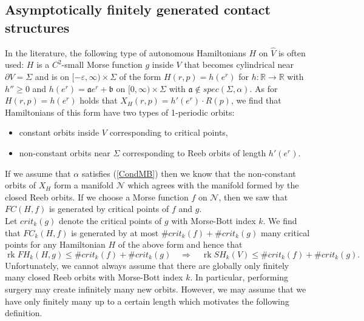 \documentclass[a4paper,12pt,bibliography=totocnumbered,titlepage=false,abstracton,bookmarksnumbered=true]{scrartcl}
\DeclareMathOperator{\rk}{rk}
\newcommand{\veps}{\varepsilon}
\theoremstyle{definition}
\begin{document}
\subsection{Asymptotically finitely generated contact structures}\label{secAsmFini}
In the literature, the following type of autonomous Hamiltonians $H$ on $\widehat{V}$ is often used: $H$ is a $C^2$-small Morse function $g$ inside $V$ that becomes cylindrical near $\partial V=\Sigma$ and is on $[-\veps,\infty){\times}\Sigma$ of the form $H(r,p)=h(e^r)$ for $h:\mathbb{R}\rightarrow\mathbb{R}$ with $h''\geq 0$ and $h(e^r)=\mathfrak{a} e^r+\mathfrak{b}$ on $[0,\infty){\times}\Sigma$ with $\mathfrak{a}\not\in spec(\Sigma,\alpha)$. As for $H(r,p)=h(e^r)$ holds that $X_H(r,p)=h'(e^r){\cdot} R(p)$, we find that Hamiltonians of this form have two types of 1-periodic orbits:
\begin{itemize}
 \item constant orbits inside $V$ corresponding to critical points,
 \item non-constant orbits near $\Sigma$ corresponding to Reeb orbits of length $h'(e^r)$.
\end{itemize}
 If we assume that $\alpha$ satisfies (\ref{CondMB}) then we know that the non-constant orbits of $X_H$ form a manifold $\mathcal{N}$ which agrees with the manifold formed by the closed Reeb orbits. If we choose a Morse function $f$ on $\mathcal{N}$, then we saw that $FC(H,f)$ is generated by critical points of $f$ and $g$.\\
 Let $crit_k(g)$ denote the critical points of $g$ with Morse-Bott index $k$. We find that $FC_k(H,f)$ is generated by at most $\# crit_k(f)+\#crit_k(g)$ many critical points for any Hamiltonian $H$ of the above form and hence that
 \[\rk FH_k(H,g)\leq \# crit_k(f)+\# crit_k(g)\quad\Rightarrow\quad \rk SH_k(V)\leq \# crit_k(f)+\# crit_k(g).\]
 Unfortunately, we cannot always assume that there are globally only finitely many closed Reeb orbits with Morse-Bott index $k$. In particular, performing surgery may create infinitely many new orbits. However, we may assume that we have only finitely many up to a certain length which motivates the following definition.
\end{document}
